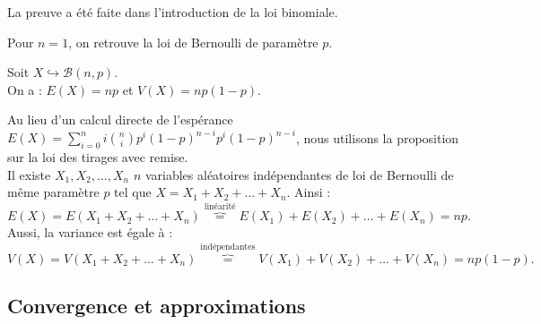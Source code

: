 \documentclass{book}
\begin{document}
\begin{Demonstration}
La preuve a été faite dans l'introduction de la loi binomiale.
\end{Demonstration}
\begin{Remarque}
Pour $n=1$, on retrouve la loi de Bernoulli de paramètre $p$.
\end{Remarque}
\begin{Proposition}
Soit $X\hookrightarrow  \mathcal{B}(n,p)$.\\
On a : $E(X)=np$ et $V(X)=np(1-p)$.
\end{Proposition}
\begin{Demonstration}
Au lieu d'un calcul directe de l'espérance $E(X)=\sum_{i=0}^n i   \binom{n}{i} p^i (1-p)^{n-i} p^i (1-p)^{n-i}$, nous utilisons la proposition sur la loi des tirages avec remise.\\
Il existe $X_1, X_2,\dots, X_n$ $n$ variables aléatoires indépendantes de loi de Bernoulli de même paramètre $p$ tel que $X=X_1+ X_2+\dots+ X_n$. Ainsi :
$$E(X)=E(X_1+ X_2+\dots+ X_n)\overbrace{=}^{\text{linéarité}}E(X_1)+ E(X_2)+\dots+ E(X_n)=np.$$
Aussi, la variance est égale à :
$$V(X)=V(X_1+ X_2+\dots+ X_n)\overbrace{=}^{\text{indépendantes}}V(X_1)+ V(X_2)+\dots+ V(X_n)=np(1-p).$$
\end{Demonstration}


\subsection{Convergence et approximations}
\end{document}
